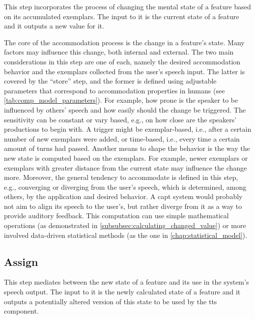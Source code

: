 This step incorporates the process of changing the mental state of a feature based on its accumulated exemplars.
The input to it is the current state of a feature and it outputs a new value for it.

The core of the accommodation process is the change in a feature's state.
Many factors may influence this change, both internal and external.
The two main considerations in this step are one of each, namely the desired accommodation behavior and the exemplars collected from the user's speech input.
The latter is covered by the \enquote{store} step, and the former is defined using adjustable parameters that correspond to accommodation properties in humans (see \cref{tab:comp_model_parameters}).
For example, how prone is the speaker to be influenced by others' speech and how easily should the change be triggered.
The sensitivity can be constant or vary based, e.g., on how close are the speakers' productions to begin with.
A trigger might be exemplar-based, i.e., after a certain number of new exemplars were added, or time-based, i.e., every time a certain amount of turns had passed.
Another means to shape the behavior is the way the new state is computed based on the exemplars.
For example, newer exemplars or exemplars with greater distance from the current state may influence the change more.
Moreover, the general tendency to accommodate is defined in this step, e.g., converging or diverging from the user's speech, which is determined, among others, by the application and desired behavior.
A \ac{capt} system would probably not aim to align its speech to the user's, but rather diverge from it as a way to provide auditory feedback.
This computation can use simple mathematical operations (as demonstrated in \cref{subsubsec:calculating_changed_value}) or more involved data-driven statistical methods (as the one in \cref{chap:statistical_model}).

\subsection{Assign}
\label{subsec:assign}

This step mediates between the new state of a feature and its use in the system's speech output.
The input to it is the newly calculated state of a feature and it outputs a potentially altered version of this state to be used by the \ac{tts} component.


